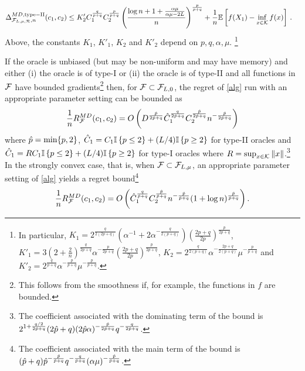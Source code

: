 \begin{theorem}
\begin{align}
\end{align}
\begin{align}
\Delta_{\F_{L,\mu,\cR},n}^{MD, \mathrm{type-II}}(c_1,c_2) 
& %
\leq  K'_2C_1^{\frac{q}{p+q}}C_2^{\frac{p}{p+q}} \left( \frac{\log n+1+\frac{\alpha \mu}{\alpha \mu -2L}}{n} \right)^{\frac{p}{p+q}}  + \frac{1}{n}\EE{f(X_1)-\inf_{x \in \cK}f(x)} 
\,.
\label{eq:MDbound2}
\end{align}
Above,
the constants $K_1$, $K'_1$, $K_2$ and $K'_2$ depend on $p, q, \alpha, \mu$.%
\footnote{
In particular,
$K_1 = 2^{\frac{q}{2(2p+q)}} \left( \alpha^{-1}+2\alpha^{-\frac{q}{2(p+q)}} \right) \left( \frac{2p+q}{2p} \right)^{\frac{p}{2p+q}}$,
$K'_1 = 3 \left(2+\frac{2}{n}\right)^{\frac{q}{2p+q} } \alpha^{-\frac{p}{2p+q}}\left(\frac{2p+q}{2p} \right)^{\frac{p}{2p+q}}$,
$K_2=2^{\frac{q}{2(p+q)}}\alpha^{-\frac{2p+q}{2(p+q)}}\mu^{-\frac{p}{p+q}}$
and
$K'_2=2^{\frac{q}{p+q}}\alpha^{-\frac{p}{p+q}}\mu^{-\frac{p}{p+q}}$.}

If the oracle is unbiased (but may be non-uniform and may have memory) and either
(i) the oracle is of type-I or (ii) the oracle is of type-II and all functions in $\mathcal{F}$ have bounded gradients\footnote{This follows from the smoothness if, for example, the functions in $f$  are bounded.} then, for $\mathcal{F} \subset \mathcal{F}_{L,0}$, the regret of \cref{alg} run with an appropriate parameter setting can be bounded as
\[
\frac{1}{n} R_{\mathcal{F}}^{MD}(c_1,c_2) = O\left( D^{\frac{\hat{p}}{2\hat{p}+q}} \hat{C}_1^{\frac{q}{2\hat{p}+q}} C_2^{\frac{\hat{p}}{2\hat{p}+q}}  n^{-\frac{\hat{p}}{2\hat{p}+q}} \right)
\]
where $\hat{p}=\min\{p,2\}$, $\hat{C}_1=C_1 \mathbb{I}\left\{p \le 2\right\} + (L/4) \mathbb{I}\left\{p \ge 2\right\}$ for type-II oracles and $\hat{C}_1=R C_1 \mathbb{I}\left\{p \le 2\right\} + (L/4) \mathbb{I}\left\{p \ge 2\right\}$ for type-I oracles where $R = \sup_{x\in\mathcal{K}} \|x\|$.\footnote{The coefficient associated with the dominating term of the bound is
$2^{1+\frac{q/2}{2\hat{p}+q}}(2\hat{p}+q) (2\hat{p} \alpha)^{-\frac{\hat{p}}{2\hat{p}+q}} q^{-\frac{q}{2\hat{p}+q}}$.} In the strongly convex case, that is, when $\mathcal{F} \subset \mathcal{F}_{L,\mu}$, an appropriate parameter setting of \cref{alg} yields a regret bound\footnote{
The coefficient associated with the main term of the bound is $(\hat{p}+q)\hat{p}^{-\frac{\hat{p}}{\hat{p}+q}} q^{-\frac{q}{\hat{p}+q}} (\alpha \mu)^{-\frac{\hat{p}}{\hat{p}+q}}$.}
\[
\frac{1}{n} R_{\mathcal{F}}^{MD}(c_1,c_2) = O\left(\hat{C}_1^{\frac{q}{\hat{p}+q}} C_2^{\frac{\hat{p}}{\hat{p}+q}} n^{-\frac{\hat{p}}{\hat{p}+q}} (1+\log n)^{\frac{\hat{p}}{\hat{p}+q}} \right).
\]
\end{theorem}

